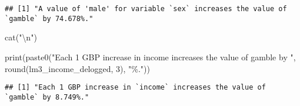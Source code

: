 \documentclass[
]{article}
\newenvironment{Shaded}{\begin{snugshade}}{\end{snugshade}}
\newcommand{\DecValTok}[1]{\textcolor[rgb]{0.00,0.00,0.81}{#1}}
\newcommand{\FunctionTok}[1]{\textcolor[rgb]{0.00,0.00,0.00}{#1}}
\newcommand{\NormalTok}[1]{#1}
\newcommand{\SpecialCharTok}[1]{\textcolor[rgb]{0.00,0.00,0.00}{#1}}
\newcommand{\StringTok}[1]{\textcolor[rgb]{0.31,0.60,0.02}{#1}}
\begin{document}
\begin{verbatim}
## [1] "A value of 'male' for variable `sex` increases the value of `gamble` by 74.678%."
\end{verbatim}

\begin{Shaded}
\begin{Highlighting}[]
\FunctionTok{cat}\NormalTok{(}\StringTok{"}\SpecialCharTok{\textbackslash{}n}\StringTok{"}\NormalTok{)}
\end{Highlighting}
\end{Shaded}

\begin{Shaded}
\begin{Highlighting}[]
\FunctionTok{print}\NormalTok{(}\FunctionTok{paste0}\NormalTok{(}\StringTok{"Each 1 GBP increase in \textasciigrave{}income\textasciigrave{} increases the value of \textasciigrave{}gamble\textasciigrave{} by "}\NormalTok{, }\FunctionTok{round}\NormalTok{(lm3\_income\_delogged, }\DecValTok{3}\NormalTok{), }\StringTok{"\%."}\NormalTok{))}
\end{Highlighting}
\end{Shaded}

\begin{verbatim}
## [1] "Each 1 GBP increase in `income` increases the value of `gamble` by 8.749%."
\end{verbatim}
\end{document}
